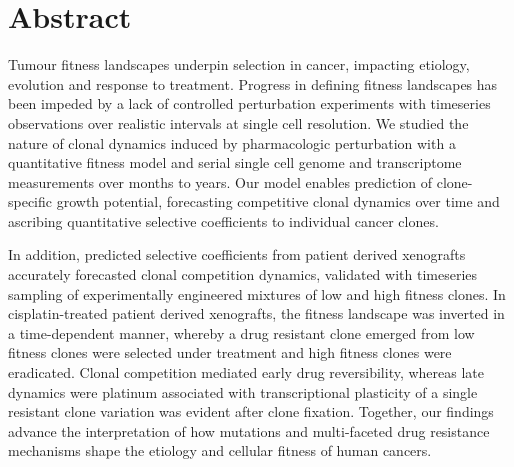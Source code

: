 

\chapter{Abstract}
Tumour fitness landscapes underpin selection in cancer, impacting etiology, evolution and response to treatment. Progress in defining fitness landscapes has been impeded by a lack of controlled perturbation experiments with timeseries observations over realistic intervals at single cell resolution.
We studied the nature of clonal dynamics induced by  pharmacologic perturbation with a quantitative fitness model and serial single cell genome and transcriptome measurements over months to years. 
Our model enables prediction of clone-specific growth potential, forecasting competitive clonal dynamics over time and ascribing  quantitative selective coefficients to individual cancer clones. 

In addition, predicted selective coefficients from patient derived xenografts accurately forecasted clonal competition dynamics, validated with timeseries sampling of experimentally engineered mixtures of low and high fitness clones.
In cisplatin-treated patient derived xenografts, the fitness landscape was inverted in a time-dependent manner, whereby a drug resistant clone emerged from low fitness clones were selected under treatment and high fitness clones were eradicated. 
Clonal competition mediated early drug reversibility, whereas late dynamics were platinum associated with transcriptional plasticity  of  a  single  resistant  clone variation was evident after clone fixation. 
Together, our findings advance the interpretation of how mutations and multi-faceted drug resistance mechanisms shape the etiology and cellular fitness of human cancers.


